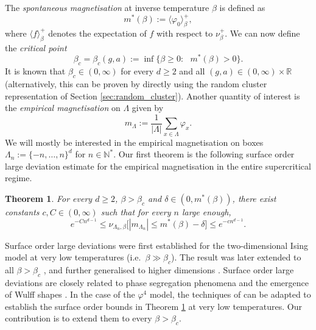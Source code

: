 \documentclass[11pt,a4paper]{article}
\newtheorem{theorem}{Theorem}[section]
\theoremstyle{definition}
\numberwithin{equation}{section}
\begin{document}
The \emph{spontaneous magnetisation} at inverse temperature $\beta$ is defined as
\begin{equation}
    m^*(\beta)
    :=
    \langle \varphi_0 \rangle^+_\beta,
\end{equation}
where $\langle f\rangle^+_\beta$ denotes the expectation of $f$ with respect to $\nu^+_\beta$.
We can now define the \emph{critical point}
\begin{equation}
    \beta_c=\beta_c(g,a)
    :=
    \inf\lbrace \beta\geq0:\text{ } m^*(\beta)>0\rbrace.
\end{equation}
It is known that $\beta_c\in (0,\infty)$ for every $d\geq 2$ and all $(g,a)\in (0,\infty)\times \mathbb R$  \cite{GlimmJaffeSpencer1975PHI4,wells1977some} (alternatively, this can be proven by directly using the random cluster representation of Section \ref{sec:random_cluster}). 
Another quantity of interest is the \emph{empirical magnetisation} on $\Lambda$ given by
\begin{equation}
    m_{\Lambda}:= \frac{1}{|\Lambda|} \sum_{x\in\Lambda} \varphi_x.
\end{equation}
We will mostly be interested in the empirical magnetisation on boxes $\Lambda_n:=\{-n,\dots,n\}^d$ for $n \in \mathbb N^*$. Our first theorem is the following surface order large deviation estimate for the empirical magnetisation in the entire supercritical regime.

\begin{theorem}\label{thm:ldp free}
    For every $d\geq2$, $\beta > \beta_c$ and $\delta\in(0,m^*(\beta) )$, there exist constants $c,C\in(0,\infty)$ such that for every $n$ large enough,
    \begin{equation}\label{eq:ldp surface}
    e^{-Cn^{d-1}}\leq \nu_{\Lambda_n,\beta}\Big[ |m_{\Lambda_n}|\leq m^*(\beta)-\delta\Big]\leq e^{-cn^{d-1}}.
    \end{equation}
\end{theorem}

Surface order large deviations were first established for the two-dimensional Ising model \cite{schonmann1987second} at very low temperatures (i.e.\ $\beta\gg \beta_c$). The result was later extended to all $\beta > \beta_c$ \cite{CCS87}, and further generalised to higher dimensions \cite{Pis96}. Surface order large deviations are closely related to phase segregation phenomena and the emergence of Wulff shapes
\cite{dobrushin1992wulff,ioffe1995exact,cerf2000wulff,bodineau2000rigorous}. In the case of the $\varphi^4$ model, the techniques of \cite{CGW22} can be adapted to establish the surface order bounds in Theorem \ref{thm:ldp free} at very low temperatures. Our contribution is to extend them to every $\beta > \beta_c$.
\end{document}
